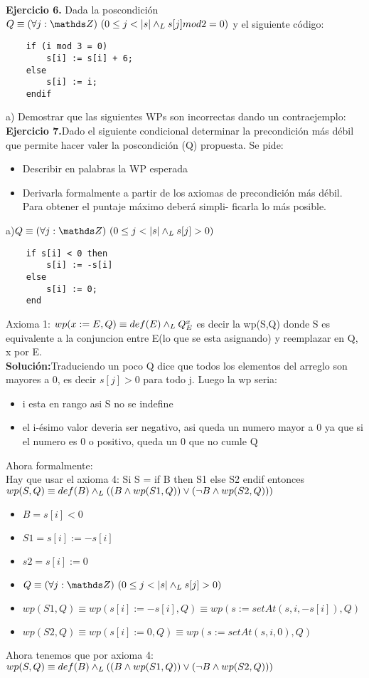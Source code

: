 \documentclass{article}
\begin{document}
\textbf{Ejercicio 6.} Dada la poscondici\'on $Q \equiv \paraTodo[unalinea]{j}{\ent}{0 \leq j < |s| \yLuego s[j] mod 2 = 0}$ y el siguiente c\'odigo:
\begin{lstlisting}
	if (i mod 3 = 0)
		s[i] := s[i] + 6;
	else
		s[i] := i;
	endif
\end{lstlisting}
a) Demostrar que las siguientes WPs son incorrectas dando un contraejemplo:\\

\textbf{Ejercicio 7.}Dado el siguiente condicional determinar la precondici\'on m\'as d\'ebil que permite hacer valer la poscondici\'on (Q)
propuesta. Se pide:
\begin{itemize}
	\item Describir en palabras la WP esperada
	\item Derivarla formalmente a partir de los axiomas de precondici\'on m\'as d\'ebil. Para obtener el puntaje m\'aximo deber\'a simpli-
	ficarla lo m\'as posible.
\end{itemize}
a)$Q \equiv {\paraTodo[unalinea]{j}{\ent}{0 \leq j < |s| \yLuego s[j] > 0}}$
\begin{lstlisting}
	if s[i] < 0 then
		s[i] := -s[i]
	else
		s[i] := 0;
	end
\end{lstlisting}
Axioma 1: $wp(x := E, Q) \equiv def(E) \land _L Q^x_E$ es decir la wp(S,Q) donde S es equivalente a la conjuncion entre E(lo que se esta asignando) y reemplazar en Q, x por E.\\
\textbf{Soluci\'on:}Traduciendo un poco Q dice que todos los elementos del arreglo son mayores a 0, es decir $s[j] > 0$ para todo j. Luego la wp seria:
\begin{itemize}
	\item i esta en rango asi S no se indefine
	\item el i-\'esimo valor deveria ser negativo, asi queda un numero mayor a 0 ya que si el numero es 0 o positivo, queda un 0 que no cumle Q
\end{itemize}
Ahora formalmente:\\
Hay que usar el axioma 4: Si S = if B then S1 else S2 endif entonces $wp(S,Q) \equiv def(B) \land _L ((B \land wp(S1,Q)) \lor (\lnot B \land wp(S2, Q)))$

\begin{itemize}
	\item $B = s[i] < 0$
	\item $S1 = s[i] := -s[i]$
	\item $s2 = s[i] := 0$
	\item $Q \equiv {\paraTodo[unalinea]{j}{\ent}{0 \leq j < |s| \yLuego s[j] > 0}}$
	\item $wp(S1,Q) \equiv wp(s[i] := -s[i], Q) \equiv wp(s := setAt(s,i,-s[i]), Q)$
	\item $wp(S2,Q) \equiv wp(s[i] := 0, Q) \equiv wp(s := setAt(s,i,0), Q)$
\end{itemize}
Ahora tenemos que por axioma 4:\\
\indent$wp(S,Q) \equiv def(B) \land _L ((B \land wp(S1,Q)) \lor (\lnot B \land wp(S2, Q)))$\\
\end{document}

